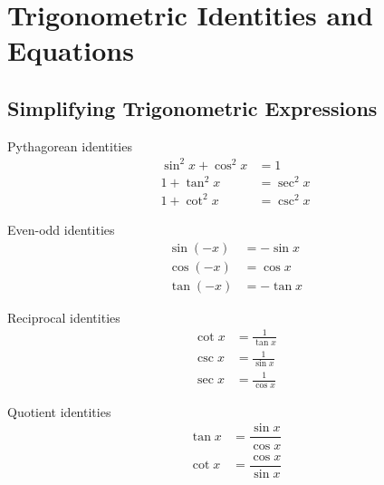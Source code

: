 
\chapter{Trigonometric Identities and Equations}

\section{Simplifying Trigonometric Expressions}

\begin{note}
  \begin{multicols}{4}
  Pythagorean identities
\begin{align*}
  \sin^2 x + \cos^2 x &= 1\\
  1 + \tan^2 x &= \sec^2 x\\
  1 + \cot^2 x &= \csc^2 x
\end{align*}

  \columnbreak

Even-odd identities
    \begin{align*}
      \sin(-x)  &= - \sin x\\
      \cos(-x)  &= \cos x\\
      \tan(-x)  &= -\tan x
    \end{align*}

    \columnbreak

    Reciprocal identities
    \begin{align*}
      \cot x &= \frac{1}{\tan x}\\
      \csc x &= \frac{1}{\sin x}\\
      \sec x &= \frac{1}{\cos x}
    \end{align*}
 
    \columnbreak

    Quotient identities 
    \begin{align*}
      \tan x & =\dfrac{\sin x}{\cos x}\\
      \cot x &=\dfrac{\cos x}{\sin x}
    \end{align*}
  


  \end{multicols}
\end{note}

